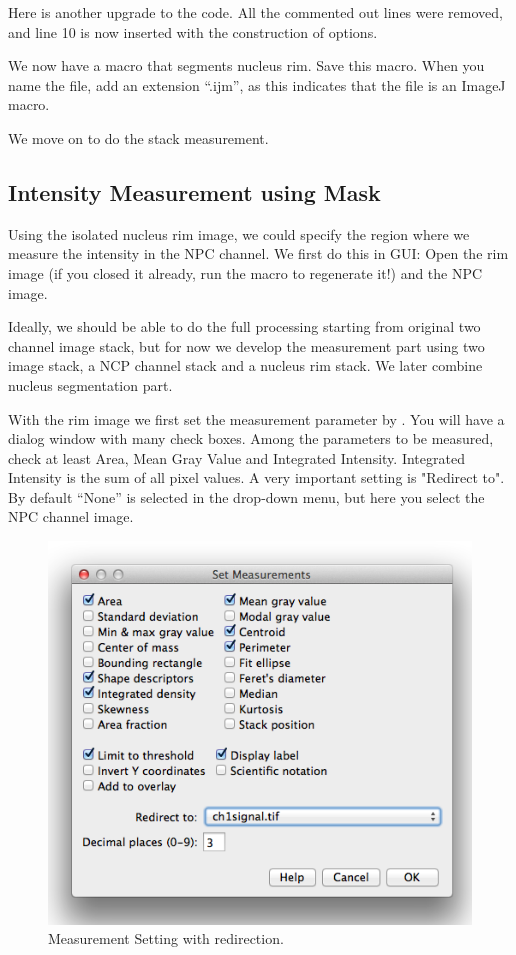 Here is another upgrade to the code. All the commented out lines were removed, and line 10 is now inserted with the construction of options. 



We now have a macro that segments nucleus rim. Save this macro. When you name the file, add an extension ``.ijm'', as this indicates that the file is an ImageJ macro. 

We move on to do the stack measurement. 

\subsection{Intensity Measurement using Mask}

Using the isolated nucleus rim image, we could specify the region where we measure the intensity in the NPC channel. We first do this in GUI: Open the rim image (if you closed it already, run the macro to regenerate it!) and the NPC image. 

Ideally, we should be able to do the full processing starting from original two channel image stack, but for now we develop the measurement part using two image stack, a NCP channel stack and a nucleus rim stack. We later combine nucleus segmentation part. 

With the rim image we first set the measurement parameter by . You will have a dialog window with many check boxes. Among the parameters to be measured, check at least Area, Mean Gray Value and Integrated Intensity. Integrated Intensity is the sum of all pixel values. A very important setting is "Redirect to". By default ``None'' is selected in the drop-down menu, but here you select the NPC channel image. 

\begin{figure}[h!]
\begin{center}
\includegraphics[scale=0.5]{fig/SetMeasurementsRedirect.png}
\caption{Measurement Setting with redirection.}
\label{fig_MeasSettingRedirect}
\end{center}
\end{figure}

